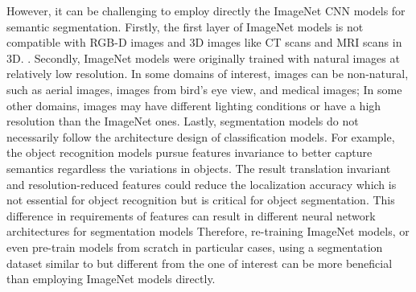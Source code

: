 However, it can be challenging to employ directly the ImageNet CNN models for semantic segmentation.
Firstly, the first layer of ImageNet models is not compatible with RGB-D images and 3D images like CT scans and MRI scans in 3D.
\cite{zheng2015conditional}.
Secondly, ImageNet models were originally trained with natural images at relatively low resolution.
In some domains of interest, images can be non-natural, such as aerial images, images from bird's eye view, and medical images;
In some other domains, images may have different lighting conditions or have a high resolution than the ImageNet ones.
Lastly, segmentation models do not necessarily follow the architecture design of classification models.
For example, the object recognition models pursue features invariance to better capture semantics regardless the variations in objects.
The result translation invariant and resolution-reduced features could reduce the localization accuracy which is not essential for object recognition but is critical for object segmentation. \cite{zheng2015conditional,chen2016deeplab}
This difference in requirements of features can result in different neural network architectures for segmentation models
Therefore, re-training ImageNet models, or even pre-train models from scratch in particular cases, using a segmentation dataset similar to but different from the one of interest can be more beneficial than employing ImageNet models directly.







